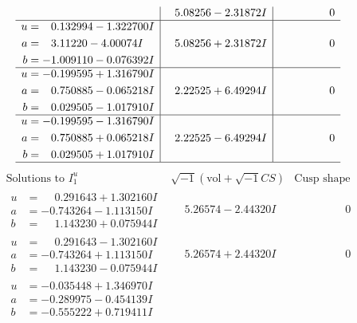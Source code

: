\documentclass[1p]{elsarticle_modified}
\theoremstyle{definition}
\newcommand{\I}{\sqrt{-1}}
\begin{document}
$$\begin{array}{c|c|c}
 & \phantom{-}5.08256 - 2.31872 I & \phantom{-0.000000 } 0 \\ \hline\begin{aligned}
u &= \phantom{-}0.132994 - 1.322700 I \\
a &= \phantom{-}3.11220 - 4.00074 I \\
b &= -1.009110 - 0.076392 I\end{aligned}
 & \phantom{-}5.08256 + 2.31872 I & \phantom{-0.000000 } 0 \\ \hline\begin{aligned}
u &= -0.199595 + 1.316790 I \\
a &= \phantom{-}0.750885 - 0.065218 I \\
b &= \phantom{-}0.029505 - 1.017910 I\end{aligned}
 & \phantom{-}2.22525 + 6.49294 I & \phantom{-0.000000 } 0 \\ \hline\begin{aligned}
u &= -0.199595 - 1.316790 I \\
a &= \phantom{-}0.750885 + 0.065218 I \\
b &= \phantom{-}0.029505 + 1.017910 I\end{aligned}
 & \phantom{-}2.22525 - 6.49294 I & \phantom{-0.000000 } 0\\
 \hline 
 \end{array}$$\newpage$$\begin{array}{c|c|c}  
\text{Solutions to }I^u_{1}& \I (\text{vol} + \sqrt{-1}CS) & \text{Cusp shape}\\
 \hline 
\begin{aligned}
u &= \phantom{-}0.291643 + 1.302160 I \\
a &= -0.743264 - 1.113150 I \\
b &= \phantom{-}1.143230 + 0.075944 I\end{aligned}
 & \phantom{-}5.26574 - 2.44320 I & \phantom{-0.000000 } 0 \\ \hline\begin{aligned}
u &= \phantom{-}0.291643 - 1.302160 I \\
a &= -0.743264 + 1.113150 I \\
b &= \phantom{-}1.143230 - 0.075944 I\end{aligned}
 & \phantom{-}5.26574 + 2.44320 I & \phantom{-0.000000 } 0 \\ \hline\begin{aligned}
u &= -0.035448 + 1.346970 I \\
a &= -0.289975 - 0.454139 I \\
b &= -0.555222 + 0.719411 I\end{aligned}

\end{array}$$
\end{document}
